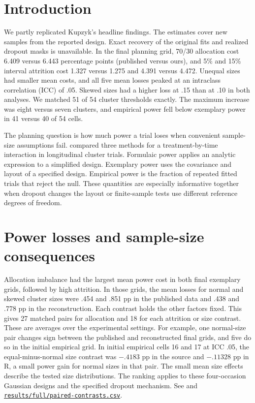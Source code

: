 \section{Introduction}\label{sec:intro}
We partly replicated Kupzyk's headline findings. The estimates cover new samples from the reported design. Exact recovery of the original fits and realized dropout masks is unavailable. In the final planning grid, 70/30 allocation cost 6.409 versus 6.443 percentage points (published versus ours), and 5\% and 15\% interval attrition cost 1.327 versus 1.275 and 4.391 versus 4.472. Unequal sizes had smaller mean costs, and all five mean losses peaked at an intraclass correlation (ICC) of .05. Skewed sizes had a higher loss at .15 than at .10 in both analyses. We matched 51 of 54 cluster thresholds exactly. The maximum increase was eight versus seven clusters, and empirical power fell below exemplary power in 41 versus 40 of 54 cells.

The planning question is how much power a trial loses when convenient sample-size assumptions fail. \citet[pp.~1--6, 64--67]{kupzyk2011} compared three methods for a treatment-by-time interaction in longitudinal cluster trials. Formulaic power applies an analytic expression to a simplified design. Exemplary power uses the covariance and layout of a specified design. Empirical power is the fraction of repeated fitted trials that reject the null. These quantities are especially informative together when dropout changes the layout or finite-sample tests use different reference degrees of freedom.

\section{Power losses and sample-size consequences}\label{sec:effects}
Allocation imbalance had the largest mean power cost in both final exemplary grids, followed by high attrition. In those grids, the mean losses for normal and skewed cluster sizes were .454 and .851 pp in the published data and .438 and .778 pp in the reconstruction. Each contrast holds the other factors fixed. This gives 27 matched pairs for allocation and 18 for each attrition or size contrast. These are averages over the experimental settings. For example, one normal-size pair changes sign between the published and reconstructed final grids, and five do so in the initial empirical grid. In initial empirical cells 16 and 17 at ICC .05, the equal-minus-normal size contrast was $-.4183$ pp in the source and $-.11328$ pp in R, a small power gain for normal sizes in that pair. The small mean size effects describe the tested size distributions. The ranking applies to these four-occasion Gaussian designs and the specified dropout mechanism. See \citet[Tables 1--2 and 4]{kupzyk2011} and \href{https://github.com/alectionary/vibe-math/blob/master/formalization/kupzyk-power-assumptions/results/full/paired-contrasts.csv}{\nolinkurl{results/full/paired-contrasts.csv}}.

